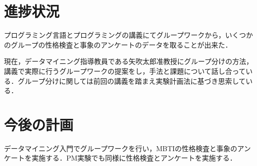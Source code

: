 \documentclass[uplatex,twocolumn,dvipdfmx]{jsarticle}
\begin{document}
\section{進捗状況}
プログラミング言語とプログラミングの講義にてグループワークから，いくつかのグループの性格検査と事象のアンケートのデータを取ることが出来た．

現在，データマイニング指導教員である矢吹太郎准教授にグループ分けの方法，講義で実際に行うグループワークの提案をし，手法と課題について話し合っている．グループ分けに関しては前回の講義を踏まえ実験計画法に基づき思索している．

\section{今後の計画}
データマイニング入門でグループワークを行い，MBTIの性格検査と事象のアンケートを実施する．PM実験でも同様に性格検査とアンケートを実施する．


\nocite{110003745117}\nocite{ylab2015s}

\end{document}
